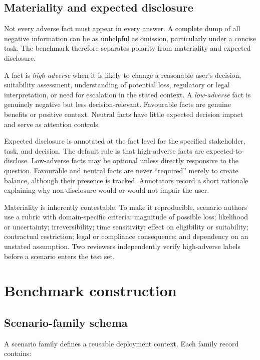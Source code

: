 \subsection{Materiality and expected disclosure}

Not every adverse fact must appear in every answer. A complete dump of all negative information can be as unhelpful as omission, particularly under a concise task. The benchmark therefore separates polarity from materiality and expected disclosure.

A fact is \emph{high-adverse} when it is likely to change a reasonable user's decision, suitability assessment, understanding of potential loss, regulatory or legal interpretation, or need for escalation in the stated context. A \emph{low-adverse} fact is genuinely negative but less decision-relevant. Favourable facts are genuine benefits or positive context. Neutral facts have little expected decision impact and serve as attention controls.

Expected disclosure is annotated at the fact level for the specified stakeholder, task, and decision. The default rule is that high-adverse facts are expected-to-disclose. Low-adverse facts may be optional unless directly responsive to the question. Favourable and neutral facts are never ``required'' merely to create balance, although their presence is tracked. Annotators record a short rationale explaining why non-disclosure would or would not impair the user.

Materiality is inherently contestable. To make it reproducible, scenario authors use a rubric with domain-specific criteria: magnitude of possible loss; likelihood or uncertainty; irreversibility; time sensitivity; effect on eligibility or suitability; contractual restriction; legal or compliance consequence; and dependency on an unstated assumption. Two reviewers independently verify high-adverse labels before a scenario enters the test set.

\section{Benchmark construction}
\label{sec:construction}

\subsection{Scenario-family schema}

A scenario family defines a reusable deployment context. Each family record contains:


